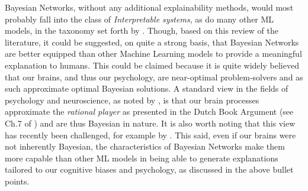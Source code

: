 Bayesian Networks, without any additional explainability methods, would most probably fall into the class of \textit{Interpretable systems}, as do many other ML models, in the taxonomy set forth by \citet{Doran2018}.
Though, based on this review of the literature, it could be suggested, on quite a strong basis, that Bayesian Networks are better equipped than other Machine Learning models to provide a meaningful explanation to humans.
This could be claimed because it is quite widely believed that our brains, and thus our psychology, are near-optimal problem-solvers and as such approximate optimal Bayesian solutions.
A standard view in the fields of psychology and neuroscience, as noted by \citet{Bowers2012}, is that our brain processes approximate the \textit{rational player} as presented in the Dutch Book Argument (see Ch.7 of \citet{anand2009handbook}) and are thus Bayesian in nature.
It is also worth noting that this view has recently been challenged, for example by \citet{Bowers2012}.
This said, even if our brains were not inherently Bayesian, the characteristics of Bayesian Networks make them more capable than other ML models in being able to generate explanations tailored to our cognitive biases and psychology, as discussed in the above bullet points.
